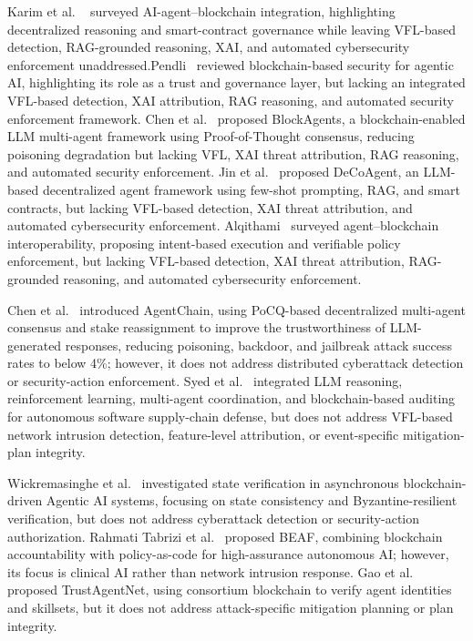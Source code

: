 \documentclass[10pt, conference]{IEEEtran}
\begin{document}
Karim et al. ~\cite{karim2025} surveyed AI-agent–blockchain integration, highlighting decentralized reasoning and smart-contract governance while leaving VFL-based detection, RAG-grounded reasoning, XAI, and automated cybersecurity enforcement unaddressed.Pendli~\cite{pendli2025} reviewed blockchain-based security for agentic AI, highlighting its role as a trust and governance layer, but lacking an integrated VFL-based detection, XAI attribution, RAG reasoning, and automated security enforcement framework. Chen et al.~\cite{chen2024} proposed BlockAgents, a blockchain-enabled LLM multi-agent framework using Proof-of-Thought consensus, reducing poisoning degradation but lacking VFL, XAI threat attribution, RAG reasoning, and automated security enforcement. Jin et al.~\cite{jin2024} proposed DeCoAgent, an LLM-based decentralized agent framework using few-shot prompting, RAG, and smart contracts, but lacking VFL-based detection, XAI threat attribution, and automated cybersecurity enforcement. 
Alqithami~\cite{alqithami2026} surveyed agent--blockchain interoperability, proposing intent-based execution and verifiable policy enforcement, but lacking VFL-based detection, XAI threat attribution, RAG-grounded reasoning, and automated cybersecurity enforcement.

Chen et al.~\cite{chen2026agentchain} introduced AgentChain, using PoCQ-based decentralized multi-agent consensus and stake reassignment to improve the trustworthiness of LLM-generated responses, reducing poisoning, backdoor, and jailbreak attack success rates to below 4\%; however, it does not address distributed cyberattack detection or security-action enforcement. Syed et al.~\cite{syed2025agentic} integrated LLM reasoning, reinforcement learning, multi-agent coordination, and blockchain-based auditing for autonomous software supply-chain defense, but does not address VFL-based network intrusion detection, feature-level attribution, or event-specific mitigation-plan integrity.

Wickremasinghe et al.~\cite{wickremasinghe2026state} investigated state verification in asynchronous blockchain-driven Agentic AI systems, focusing on state consistency and Byzantine-resilient verification, but does not address cyberattack detection or security-action authorization. Rahmati Tabrizi et al.~\cite{rahmati2025beaf} proposed BEAF, combining blockchain accountability with policy-as-code for high-assurance autonomous AI; however, its focus is clinical AI rather than network intrusion response. Gao et al.~\cite{gao2025trustagentnet} proposed TrustAgentNet, using consortium blockchain to verify agent identities and skillsets, but it does not address attack-specific mitigation planning or plan integrity. 
\end{document}
